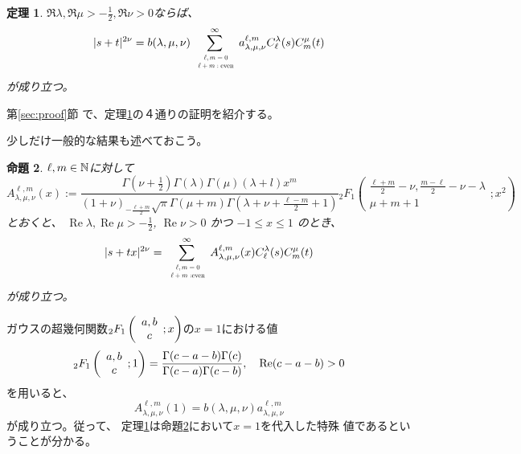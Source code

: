 \documentclass[12pt,a4paper,dvipdfmx]{jsarticle}
\numberwithin{equation}{section}
\newcommand{\tmop}[1]{\ensuremath{\operatorname{#1}}}
\newcommand{\assign}{:=}
\theoremstyle{jplain}
\newtheorem{thm}{定理}[section]
\newtheorem{prop}[thm]{命題}
\theoremstyle{remark}
\theoremstyle{definition}
\begin{document}
	\begin{thm}\label{prop:exp-st-gg}
		$\Re\lambda,\Re\mu>-\frac{1}{2},\Re\nu>0$ならば、
		\begin{equation}
			| s + t |^{2 \nu} =b(\lambda,\mu,\nu) \displaystyle\sum_{\scalebox{0.6}{ $\begin{array}[]{c}
			\ell, m = 0 \\ \ell + m : \tmop{even}
		\end{array}$}}^{\infty} a_{\lambda,\mu,\nu}^{\ell,m} C_\ell^{\lambda} (s) C_m^{\mu} (t)
			\label{eqn:exp-st-gg}
		\end{equation}
		が成り立つ。
	\end{thm}
	第\ref{sec:proof}節
	で、定理\ref{prop:exp-st-gg}の４通りの証明を紹介する。

	少しだけ一般的な結果も述べておこう。
	\begin{prop}\label{prop:exp-stz-gg}
		$\ell,m\in\mathbb{N}$に対して
		    \begin{equation*}
			    A^{\ell,m}_{\lambda,\mu,\nu} (x) \assign
			    \frac{\Gamma \left( \nu + \frac{1}{2} \right) \Gamma
				  (\lambda) \Gamma (\mu) (\lambda + l) x^m }{(1 + \nu)_{- \frac{\ell + m}{2}} \sqrt{\pi} \Gamma
				      (\mu + m) \Gamma \left( \lambda + \nu + \frac{\ell - m}{2} + 1 \right)}
				    {}_2 F_1 \left( \begin{array}{c}
				\frac{\ell + m}{2} - \nu, \frac{m - \ell}{2} - \nu - \lambda\\
				\mu + m + 1
			\end{array} ; x^2 \right)
		\end{equation*}
		とおくと、
		  $\tmop{Re} \lambda, \tmop{Re} \mu > - \frac{1}{2}$,
		    $\tmop{Re} \nu > 0$ かつ $-1 \leqslant x \leqslant 1$ のとき、
		\begin{equation*}
			       | s + t x |^{2 \nu}  = \sum_{\scalebox{0.6}{
			      $\begin{array}[]{c}
				  \ell,m=0\\\ell+ m\mbox{ :even}
				\end{array}
			$}}^{\infty} A^{\ell,m}_{\lambda,\mu,\nu}
				 (x) C_\ell^{\lambda} (s) C_m^{\mu} (t)
		    \end{equation*}
		    が成り立つ。
    \end{prop}
    ガウスの超幾何関数$_2F_1\left(\begin{array}[]{c}
	    a,b\\c
    \end{array};x\right)$の$x=1$における値
\begin{equation*}
		{}_2F_1\left( \begin{array}[]{c}
			a,b\\c
		\end{array};1\right)=\frac{\Gamma(c-a-b)\Gamma(c)}{\Gamma(c-a)\Gamma(c-b)},\quad \Re(c-a-b)>0
	\end{equation*}
	を用いると、\begin{equation*}
		A^{\ell,m}_{\lambda,\mu,\nu}(1)=b(\lambda,\mu,\nu)a^{
		\ell,m}_{\lambda,\mu,\nu}
	\end{equation*}が成り立つ。従って、
	定理\ref{prop:exp-st-gg}は命題\ref{prop:exp-stz-gg}において$x=1$を代入した特{殊}
	値であるということが分かる。
\end{document}
